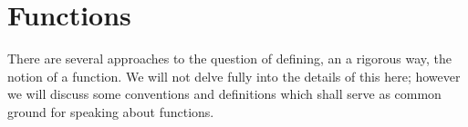 

\section{Functions}



There are several approaches to the question of defining, an a rigorous way, the notion of a function. We will not delve fully into the details of this here; however we will discuss some conventions and definitions which shall serve as common ground for speaking about functions.


\clearpage
